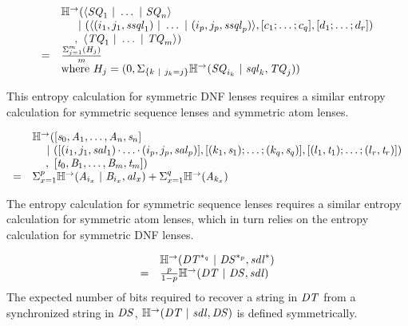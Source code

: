 \documentclass[acmsmall,screen,anonymous]{acmart}
\begin{document}
\[
  \begin{array}{rl}
    & \mathbb{H}^\rightarrow(\langle\mathit{SQ}_1 ~|~ \ldots ~|~ \mathit{SQ}_n\rangle\\
    & \hspace*{1.21em}~|~
      (\langle(i_1,j_1,\mathit{ssql}_1)~|~
      \ldots~|~
      (i_p,j_p,\mathit{ssql}_p)\rangle
      ,[ c_1;\ldots;c_q ]
      ,[ d_1;\ldots;d_r ])\\
    & \hspace*{1.21em},~\langle\mathit{TQ}_1 ~|~ \ldots ~|~ \mathit{TQ}_m\rangle)\\
    = & \frac{\Sigma_{j=1}^m(H_j)}{m}\\
    & \text{where } H_j = (0,\Sigma_{\{k~|~ j_k = j\}}
      \mathbb{H}^\rightarrow(\mathit{SQ}_{i_k}~|~\mathit{sql}_k,\mathit{TQ}_j))
  \end{array}
\]

This entropy calculation for symmetric DNF lenses requires a similar entropy
calculation for symmetric sequence lenses and symmetric atom lenses.

\[
  \begin{array}{rl}
      & \mathbb{H}^\rightarrow(
        [\mathit{s}_0,\mathit{A}_1,\ldots,\mathit{A}_n,\mathit{s}_n]\\
      & \hspace*{1em}~|~
        ([(i_1,j_1,\mathit{sal}_1)\mkern-1mu\cdot\mkern-1mu
        \ldots\mkern-1mu\cdot\mkern-1mu
        (i_p,j_p,\mathit{sal}_p)]
        ,[ (k_1,\mathit{s}_1);\ldots;(k_q,\mathit{s}_q) ]
        ,[ (l_1,\mathit{t}_1);\ldots;(l_r,\mathit{t}_r) ])\\
      & \hspace*{1.21em},~
        [\mathit{t}_0,\mathit{B}_1,\ldots,\mathit{B}_m,\mathit{t}_m])\\
      =
      & \Sigma_{x=1}^p\mathbb{H}^\rightarrow(\mathit{A}_{i_x} ~|~ \mathit{B}_{i_x},\mathit{al}_x) +
        \Sigma_{x=1}^q\mathbb{H}^\rightarrow(\mathit{A}_{k_x})
  \end{array}
\]

The entropy calculation for symmetric sequence lenses requires a similar entropy
calculation for symmetric atom lenses, which in turn relies on the entropy
calculation for symmetric DNF lenses.

\[\begin{array}{rl}
      & \mathbb{H}^\rightarrow(\mathit{DT}^{*_{q}} ~|~ \mathit{DS}^{*_{p}},{\mathit{sdl}}^*)\\
      =
      & \frac{p}{1-p}\mathbb{H}^\rightarrow(\mathit{DT}~|~\mathit{DS},\mathit{sdl})
  \end{array}
\]
The expected number of bits required to recover a string in $\mathit{DT}$ from
a synchronized string in $\mathit{DS}$, $\mathbb{H}^\rightarrow(\mathit{DT} ~|~
  \mathit{sdl}, \mathit{DS})$ is defined symmetrically.
\end{document}
